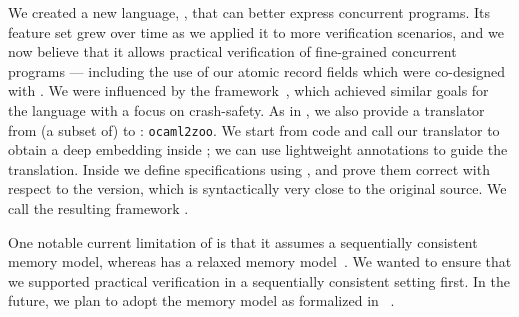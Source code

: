 We created a new \Iris language, \ZooLang, that can better express concurrent \OCaml programs.
Its feature set grew over time as we applied it to more verification scenarios, and we now believe that it allows practical verification of fine-grained concurrent \OCamlFive programs --- including the use of our atomic record fields which were co-designed with \ZooLang.
We were influenced by the \Perennial framework~\citep{DBLP:conf/sosp/ChajedTKZ19}, which achieved similar goals for the \Go language with a focus on crash-safety.
As in \Perennial, we also provide a translator from (a subset of) \OCaml to \ZooLang: \texttt{ocaml2zoo}.
We start from \OCaml code and call our translator to obtain a deep \ZooLang embedding inside \Rocq; we can use lightweight annotations to guide the translation.
Inside \Rocq we define specifications using \Iris, and prove them correct with respect to the \ZooLang version, which is syntactically very close to the original \OCaml source.
We call the resulting framework \Zoo.

One notable current limitation of \ZooLang is that it assumes a sequentially consistent memory model, whereas \OCamlFive has a relaxed memory model~\citep{DBLP:conf/pldi/DolanSM18}.
We wanted to ensure that we supported practical verification in a sequentially consistent setting first.
In the future, we plan to adopt the \OCaml memory model as formalized in \Cosmo~\citep{DBLP:journals/pacmpl/MevelJP20}.


